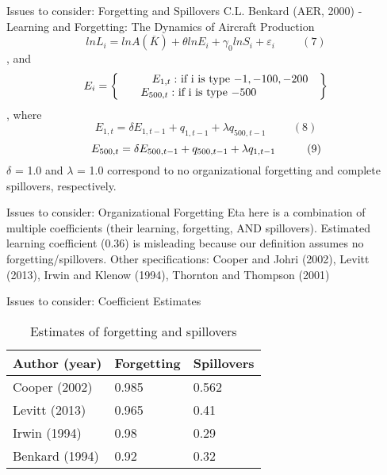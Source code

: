 \documentclass{beamer}
\begin{document}
\begin{frame}{Issues to consider: Forgetting and Spillovers}
    C.L. Benkard (AER, 2000) - Learning and Forgetting: The Dynamics of Aircraft Production
    \[ ln{L_i} = ln{A(\overline{K})} + \theta ln{E_i} + \gamma_0 ln{S_i} + \varepsilon_i \hspace{1cm} (7)\]
    , and 
    \[ E_i = 
    \begin{Bmatrix} 
        \hspace{0.7cm} E_{1, t} :$ if i is type $-1, -100, -200\\
        \hspace{0.7cm} E_{500, t} :$ if i is type $-500 \hspace{2cm}
    \end{Bmatrix} 
    \]
    , where
    \[ E_{1,t} = \delta E_{1,t-1} + q_{1,t-1} + \lambda q_{500,t-1} \hspace{1cm} (8) \]
    \[ E_{500,t} = \delta E_{500,t-1} + q_{500,t-1} + \lambda q_{1,t-1} \hspace{1cm} (9) \vspace{0.5cm}\]
    $\delta$ = 1.0 and $\lambda$ = 1.0 correspond to no organizational forgetting and complete spillovers, respectively. 
\end{frame}

\begin{frame}{Issues to consider: Organizational Forgetting}
Eta here is a combination of multiple coefficients (their learning, forgetting, AND spillovers).
\newline
\newline
Estimated learning coefficient (0.36) is misleading because our definition assumes no forgetting/spillovers.
\newline
\newline
Other specifications: Cooper and Johri (2002), Levitt (2013), Irwin and Klenow (1994), Thornton and Thompson (2001) 
\end{frame}

\begin{frame}{Issues to consider: Coefficient Estimates}
    \begin{table}
        \begin{tabular}{l l l}
            \toprule
            \textbf{Author (year)} & \textbf{Forgetting} & \textbf{Spillovers} \\
            \midrule
            Cooper (2002)         & 0.985          & 0.562               \\
            Levitt (2013)         & 0.965           & 0.41               \\
            Irwin (1994)         & 0.98           & 0.29             \\
            Benkard (1994)         & 0.92          & 0.32              \\
            \bottomrule
        \end{tabular}
        \caption{Estimates of forgetting and spillovers}
    \end{table}
\end{frame}
\end{document}
